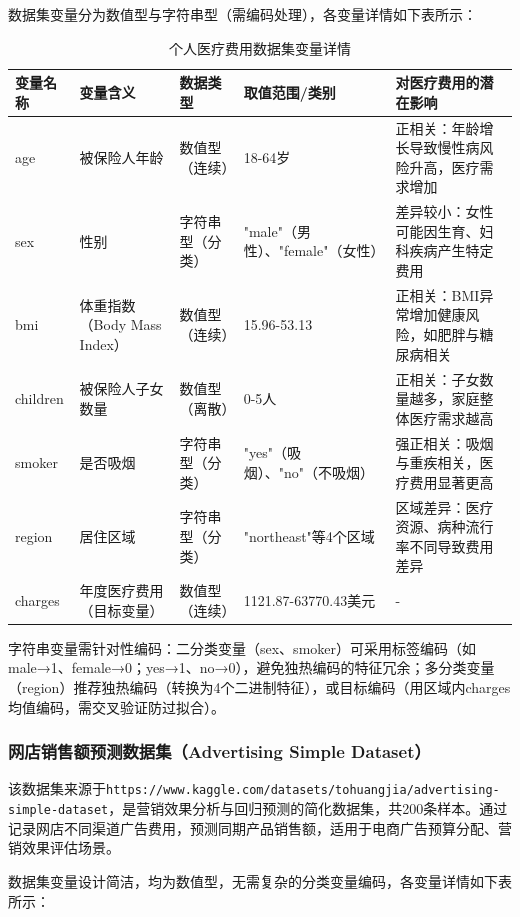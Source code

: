 数据集变量分为数值型与字符串型（需编码处理），各变量详情如下表所示：

\begin{table}[!hpt]
  \caption{个人医疗费用数据集变量详情}
  \label{tab:insurance_variables}
  \centering
  \small
  \begin{tabular}{@{}p{}p{}p{}p{}p{}@{}} \toprule
    \textbf{变量名称} & \textbf{变量含义} & \textbf{数据类型} & \textbf{取值范围/类别} & \textbf{对医疗费用的潜在影响} \\ \midrule
    age & 被保险人年龄 & 数值型（连续） & 18-64岁 & 正相关：年龄增长导致慢性病风险升高，医疗需求增加 \\
    sex & 性别 & 字符串型（分类） & "male"（男性）、"female"（女性） & 差异较小：女性可能因生育、妇科疾病产生特定费用 \\
    bmi & 体重指数（Body Mass Index） & 数值型（连续） & 15.96-53.13 & 正相关：BMI异常增加健康风险，如肥胖与糖尿病相关 \\
    children & 被保险人子女数量 & 数值型（离散） & 0-5人 & 正相关：子女数量越多，家庭整体医疗需求越高 \\
    smoker & 是否吸烟 & 字符串型（分类） & "yes"（吸烟）、"no"（不吸烟） & 强正相关：吸烟与重疾相关，医疗费用显著更高 \\
    region & 居住区域 & 字符串型（分类） & "northeast"等4个区域 & 区域差异：医疗资源、病种流行率不同导致费用差异 \\
    charges & 年度医疗费用（目标变量） & 数值型（连续） & 1121.87-63770.43美元 & - \\ \bottomrule
  \end{tabular}
\end{table}

字符串变量需针对性编码：二分类变量（sex、smoker）可采用标签编码（如male→1、female→0；yes→1、no→0），避免独热编码的特征冗余；多分类变量（region）推荐独热编码（转换为4个二进制特征），或目标编码（用区域内charges均值编码，需交叉验证防过拟合）。

\subsubsection{网店销售额预测数据集（Advertising Simple Dataset）}
该数据集来源于\texttt{https://www.kaggle.com/datasets/tohuangjia/advertising-simple-dataset}，是营销效果分析与回归预测的简化数据集，共200条样本。通过记录网店不同渠道广告费用，预测同期产品销售额，适用于电商广告预算分配、营销效果评估场景。

数据集变量设计简洁，均为数值型，无需复杂的分类变量编码，各变量详情如下表所示：

